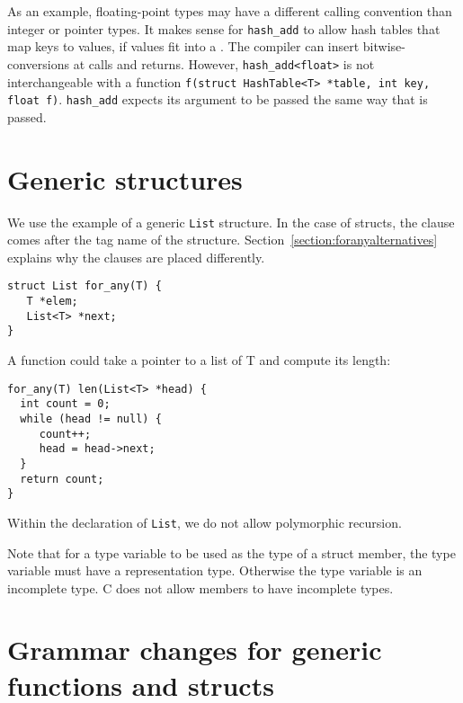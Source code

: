 As an example, floating-point types may have a different calling convention
than integer or pointer types.  It makes sense for \lstinline+hash_add+ to allow
hash tables that map keys to  values, if 
values fit into a .  The compiler can insert  
bitwise-conversions at calls and returns.   However, \lstinline+hash_add<float>+
is not interchangeable with a function \lstinline+f(struct HashTable<T> *table, int key, float f)+.
\lstinline+hash_add+ expects its argument to be passed the same way that \uncheckedptrvoid{} 
is passed.

\section{Generic structures}
We use the example of a generic \lstinline+List+ structure.   In the case of structs,
the \forany{} clause comes after the tag name of the structure.  
Section~\ref{section:foranyalternatives} explains why the \forany{} clauses 
are placed differently.
\begin{lstlisting}
struct List for_any(T) { 
   T *elem;
   List<T> *next;
}
\end{lstlisting}
A function could take a pointer to a list of T and compute its length:
\begin{lstlisting}
for_any(T) len(List<T> *head) {
  int count = 0;
  while (head != null) {
     count++;
     head = head->next;
  }
  return count;
}
\end{lstlisting}
Within the declaration of \lstinline+List+, we do not allow polymorphic recursion.

Note that for a type variable to be used as the type of a struct member, 
the type variable must have a representation type.   Otherwise the type
variable is an incomplete type.  C does not allow members to have incomplete
types.

\section{Grammar changes for generic functions and structs}

